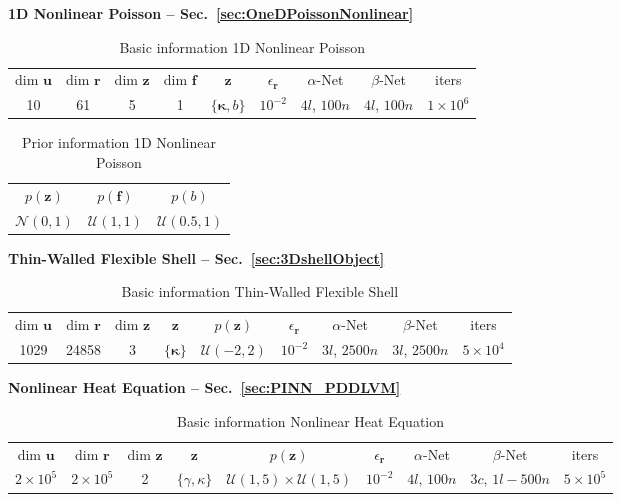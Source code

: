 \documentclass[11pt, fleqn]{article}
\def\bkappa{{\boldsymbol \kappa}}
\def\z{{\mathbf z}}
\def\fbf{{\mathbf f}}
\def\ubf{{\mathbf u}}
\def\r{{\mathbf r}}
\def\NPDF{{\mathcal N}}
\begin{document}

\textbf{ 1D Nonlinear Poisson -- Sec.~\ref{sec:OneDPoissonNonlinear} }


\begin{table}[H]
\centering
\begin{tabular}{*{9}{c} }
    \toprule 
    dim $\ubf$ & dim $\r$   & dim $\z$  & dim $\fbf$ & $\z$ & $\epsilon_\r$ & $\alpha$-Net & $\beta$-Net & iters\\
    10 & 61 & 5  & 1 & $\{\bkappa, b\}$ & $10^{-2}$ & $4l$, $100n$ & $4l$, $100n$ &  $1\times 10^{6}$\\   
    \bottomrule
\end{tabular}
\caption{Basic information  1D Nonlinear Poisson}
\end{table}

\begin{table}[H]
\centering
\begin{tabular}{*{3}{c} }
    \toprule 
    $p(\z)$ & $p(\fbf)$ & $p(b)$ \\
    $\NPDF(0, 1)$ & $\mathcal{U}(1,1)$ & $\mathcal{U}(0.5, 1)$ \\
    \bottomrule
\end{tabular}
\caption{Prior information  1D Nonlinear Poisson}
\end{table}

\textbf{ Thin-Walled Flexible Shell -- Sec.~\ref{sec:3DshellObject} }


\begin{table}[H]
\centering
\begin{tabular}{*{9}{c} }
    \toprule 
    dim $\ubf$ & dim $\r$   & dim $\z$ & $\z$ & $p(\z)$ & $\epsilon_\r$ & $\alpha$-Net & $\beta$-Net & iters\\
    1029 & 24858 & 3  & $\{\bkappa\}$ & $\mathcal{U}(-2, 2)$ & $10^{-2}$  & $3l$, $2500n$ & $3l$, $2500n$ &  $5\times 10^{4}$\\   
    \bottomrule
\end{tabular}
\caption{Basic information Thin-Walled Flexible Shell}
\end{table}

\textbf{Nonlinear Heat Equation -- Sec.~\ref{sec:PINN_PDDLVM}}


\begin{table}[H]
\centering
\begin{tabular}{*{9}{c} }
    \toprule 
    dim $\ubf$ & dim $\r$   & dim $\z$ & $\z$ & $p(\z)$ & $\epsilon_\r$ & $\alpha$-Net & $\beta$-Net & iters\\
    $2\times 10^5$ & $2\times 10^5$ & 2 & $\{\gamma, \kappa\}$ & $\mathcal{U}(1, 5)\times \mathcal{U}(1, 5)$ & $10^{-2}$  & $4l$, $100n$ & $3c$, $1l-500n$ &  $5\times 10^{5}$\\   
    \bottomrule
\end{tabular}
\caption{Basic information Nonlinear Heat Equation}
\end{table}
\end{document}
